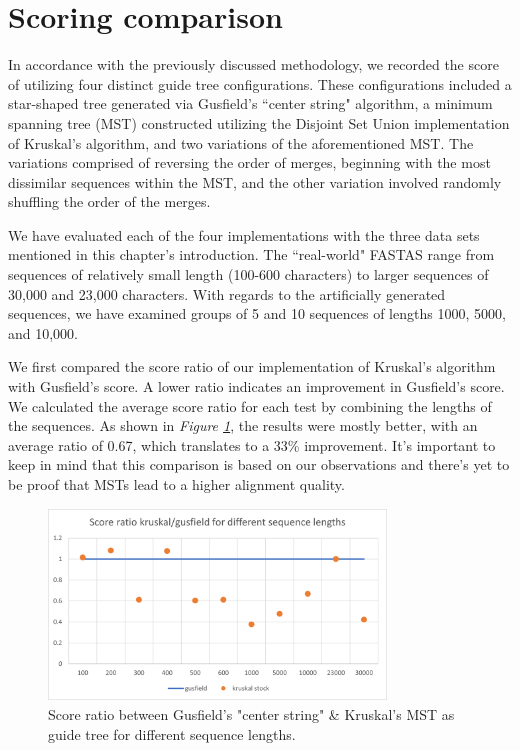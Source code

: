 \documentclass[twoside,openright,titlepage,numbers=noenddot,headinclude,%
                footinclude=true,cleardoublepage=empty,abstractoff, %
                BCOR=5mm,paper=a4,fontsize=11pt,%
                ngerman,american,%
                ]{scrreprt}
\begin{document}
\section{Scoring comparison}

In accordance with the previously discussed methodology, we recorded the score of utilizing four distinct guide tree configurations. These configurations included a star-shaped tree generated via Gusfield's ``center string" algorithm, a minimum spanning tree (MST) constructed utilizing the Disjoint Set Union implementation of Kruskal's algorithm, and two variations of the aforementioned MST. The variations comprised of reversing the order of merges, beginning with the most dissimilar sequences within the MST, and the other variation involved randomly shuffling the order of the merges.

We have evaluated each of the four implementations with the three data sets mentioned in this chapter's introduction. The ``real-world" FASTAS range from sequences of relatively small length (100-600 characters) to larger sequences of 30,000 and 23,000 characters. With regards to the artificially generated sequences, we have examined groups of 5 and 10 sequences of lengths 1000, 5000, and 10,000.

We first compared the score ratio of our implementation of Kruskal's algorithm with Gusfield's score. A lower ratio indicates an improvement in Gusfield's score. We calculated the average score ratio for each test by combining the lengths of the sequences. As shown in \textit{Figure \ref{fig:gusVSkruskal}}, the results were mostly better, with an average ratio of 0.67, which translates to a 33\% improvement. It's important to keep in mind that this comparison is based on our observations and there's yet to be proof that MSTs lead to a higher alignment quality.

\begin{figure}[H]
\includegraphics[width=0.8\textwidth]{report/kruskalVSgudfield.png}
\centering
\caption{Score ratio between Gusfield's "center string" \& Kruskal's MST as guide tree for different sequence lengths.}
\label{fig:gusVSkruskal}
\end{figure}
\end{document}
